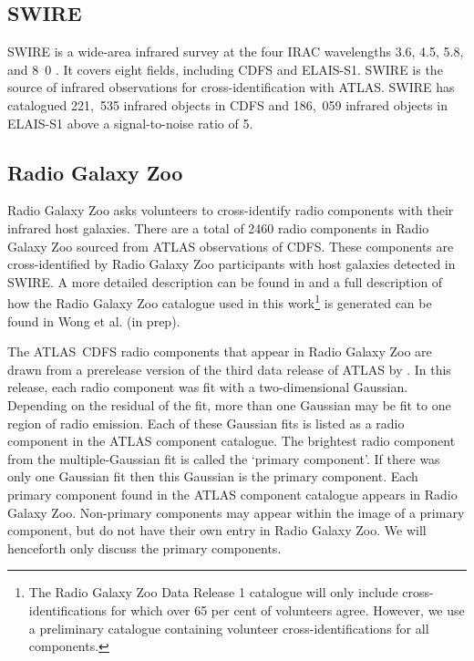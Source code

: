 \documentclass[fleqn,usenatbib,usedcolumn]{mnras}
\newcommand{\edited}[1]{#1}
\begin{document}
  \subsection{SWIRE}\label{sec:swire}

    SWIRE is a wide-area infrared
    survey at the four IRAC wavelengths 3.6, 4.5, 5.8, and
    \unit{8.0}{\micro\meter} \citep{lonsdale03swire, surace05swire}. It covers eight fields, including CDFS and ELAIS-S1. SWIRE is the source of infrared
    observations for cross-identification with ATLAS. SWIRE has catalogued 221,~535
    infrared objects in CDFS and 186,~059 infrared objects in ELAIS-S1 above a signal-to-noise ratio of 5.

  \subsection{Radio Galaxy Zoo}\label{sec:rgz}

    Radio Galaxy Zoo asks volunteers to cross-identify radio components with
    their infrared host galaxies. There are a total of 2460 radio components
    in Radio Galaxy Zoo sourced from ATLAS \edited{observations of CDFS}. These components are
    cross-identified by Radio Galaxy Zoo participants with host galaxies
    detected in SWIRE. A more detailed description can be found in
    \citet{banfield15} and a full description of how the Radio Galaxy Zoo catalogue used in this work\footnote{The Radio Galaxy Zoo Data
    Release 1 catalogue will only include cross-identifications for which over
    65 per cent of volunteers agree. However, we use a preliminary catalogue containing volunteer
    cross-identifications for all components.} is generated can be found in Wong
    et al. (in prep).

    The ATLAS~CDFS radio components that appear in Radio Galaxy Zoo \edited{are drawn from a prerelease version of} the third data release
    of ATLAS by \citet{franzen15}. In this release, each radio component was fit with a
    two-dimensional Gaussian. Depending on the residual of the fit, more than
    one Gaussian may be fit to one region of radio emission. Each of these
    Gaussian fits is listed as a radio component in the ATLAS component catalogue. The
    brightest radio component from the multiple-Gaussian fit is called the
    `primary component'. \edited{If there was only one Gaussian fit then this Gaussian is the primary component}. Each primary component found in the ATLAS
    component catalogue appears in Radio Galaxy Zoo. Non-primary components
    may appear within the image of a primary component, but do not have their
    own entry in Radio Galaxy Zoo. We will henceforth only discuss the primary
    components.
\end{document}
